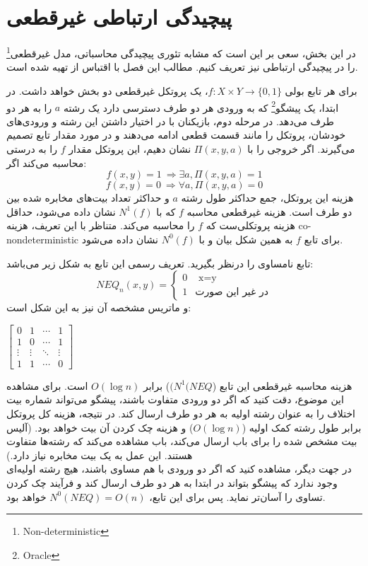 \chapter{پیچیدگی ارتباطی غیرقطعی}\label{chapter2}

در این بخش، سعی بر این است که مشابه تئوری پیچیدگی محاسباتی، مدل غیرقطعی\footnote{Non-deterministic} را در پیچیدگی ارتباطی نیز تعریف کنیم.  مطالب این فصل با اقتباس از 
 \cite{ 
 		nissan09,
 		lee09,
 		tim15,
 		toni14,
 		sherstov18,
 		laszlo86
 		}
 تهیه شده است.

برای هر تابع بولی $f: X \times Y \rightarrow \{0, 1\}$، یک پروتکل غیرقطعی دو بخش خواهد داشت. در ابتدا، یک پیشگو\footnote{Oracle} که به ورودی هر دو طرف دسترسی دارد یک رشته $a$ را به هر دو طرف می‌دهد. در مرحله دوم، بازیکنان با در اختیار داشتن این رشته و ورودی‌های خودشان، پروتکل را مانند قسمت قطعی ادامه می‌دهند و در مورد مقدار تابع تصمیم می‌گیرند. اگر خروجی را با $\Pi(x, y, a)$ نشان دهیم،  این پروتکل مقدار $f$ را به درستی محاسبه می‌کند اگر:
\[f(x, y) = 1\ \Rightarrow \exists a, \Pi(x, y, a) = 1\]
\[f(x, y) = 0\ \Rightarrow \forall a, \Pi(x, y, a) = 0\]
هزینه این پروتکل، جمع حداکثر طول رشته $a$ و حداکثر تعداد بیت‌های مخابره شده بین دو طرف است. هزینه غیرقطعی محاسبه $f$ که با $N^1(f)$ نشان داده می‌شود، حداقل هزینه پروتکلی‌ست که $f$ را محاسبه می‌کند. متناظر با این تعریف، هزینه co-nondeterministic برای تابع $f$ به همین شکل بیان و با $N^0(f)$ نشان داده می‌شود.
   
\begin{example}
تابع نامساوی را درنظر بگیرید. تعریف رسمی این تابع به شکل زیر می‌باشد:
\begin{equation}
    NEQ_{n}(x,y) =
    \begin{cases}
        0 & \text{ x=y}\\
        1 & \text{در غیر این صورت}
    \end{cases}
\end{equation}
و ماتریس مشخصه آن نیز به این شکل است:
\begin{center}
    $\begin{bmatrix}
         0 & 1 & \cdots & 1 \\
         1 & 0 & \cdots & 1 \\
         \vdots & \vdots & \ddots & \vdots \\
         1 & 1 & \cdots & 0
    \end{bmatrix}$
\end{center}
هزینه محاسبه غیرقطعی این تابع ($(N^1(NEQ$) برابر $O(\log n)$ است. برای مشاهده این موضوع، دقت کنید که اگر دو ورودی متفاوت باشند، پیشگو می‌تواند شماره بیت اختلاف را به عنوان رشته اولیه به هر دو طرف ارسال کند. در نتیجه، هزینه کل پروتکل برابر طول رشته کمک اولیه ($O(\log n)$) و هزینه چک کردن آن بیت خواهد بود. (آلیس بیت مشخص شده را برای باب ارسال می‌کند، باب مشاهده می‌کند که رشته‌ها متفاوت هستند. این عمل به یک بیت مخابره نیاز دارد.)\\
در جهت دیگر، مشاهده کنید که اگر دو ورودی با هم مساوی باشند، هیچ رشته اولیه‌ای وجود ندارد که پیشگو بتواند در ابتدا به هر دو طرف ارسال کند و فرآیند چک کردن تساوی را آسان‌تر نماید. پس برای این تابع، 
$N^0(NEQ) = O(n)$
خواهد بود.
\end{example}
